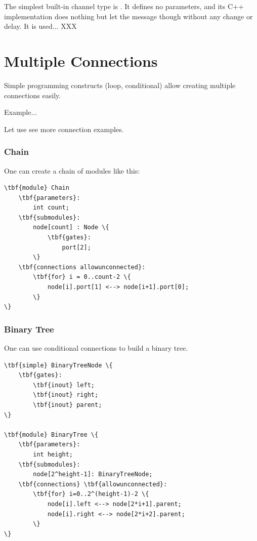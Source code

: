 The simplest built-in channel type is .
It defines no parameters, and its C++ implementation
does nothing but let the message though without any change or delay.
It is used... XXX




\section{Multiple Connections}

Simple programming constructs (loop, conditional) allow creating
multiple connections easily.

Example...

Let use see more connection examples.

\subsubsection{Chain}

One can create a chain of modules like this:

\begin{Verbatim}[commandchars=\\\{\}]
\tbf{module} Chain
    \tbf{parameters}:
        int count;
    \tbf{submodules}:
        node[count] : Node \{
            \tbf{gates}:
                port[2];
        \}
    \tbf{connections allowunconnected}:
        \tbf{for} i = 0..count-2 \{
            node[i].port[1] <--> node[i+1].port[0];
        \}
\}
\end{Verbatim}


\subsubsection{Binary Tree}

One can use conditional connections to build a binary tree.

\begin{Verbatim}[commandchars=\\\{\}]
\tbf{simple} BinaryTreeNode \{
    \tbf{gates}:
        \tbf{inout} left;
        \tbf{inout} right;
        \tbf{inout} parent;
\}

\tbf{module} BinaryTree \{
    \tbf{parameters}:
        int height;
    \tbf{submodules}:
        node[2^height-1]: BinaryTreeNode;
    \tbf{connections} \tbf{allowunconnected}:
        \tbf{for} i=0..2^(height-1)-2 \{
            node[i].left <--> node[2*i+1].parent;
            node[i].right <--> node[2*i+2].parent;
        \}
\}
\end{Verbatim}

